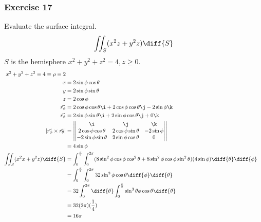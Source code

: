 \documentclass{math}
\begin{document}
\subsubsection*{Exercise 17}
Evaluate the surface integral.
\[ \iint_{S}(x^2z+y^2z)\diff{S} \]
\( S \) is the hemisphere \( x^2+y^2+z^2 = 4, z\ge0 \).
\begin{align*}
  x^2+y^2+z^2 = 4 \equiv \rho = 2 \\
  x &= 2\sin\phi\cos\theta \\
  y &= 2\sin\phi\sin\theta \\
  z &= 2\cos\phi \\
  \vec{r_{\phi}} &= 2\cos\phi\cos\theta\i+2\cos\phi\cos\theta\j-2\sin\phi\k \\
  \vec{r_{\phi}} &= 2\sin\phi\sin\theta\i+2\sin\phi\cos\theta\j+0\k \\
  |\vec{r_{\phi}}\times\vec{r_{\theta}}| &= \left|\begin{vmatrix}
    \i & \j & \k \\
    2\cos\phi\cos\theta & 2\cos\phi\sin\theta & -2\sin\phi \\
    -2\sin\phi\sin\theta & 2\sin\phi\cos\theta & 0 \\
  \end{vmatrix}\right| \\
  &= 4\sin\phi \\
  \iint_{S}(x^2x+y^2z)\diff{S} &= \int_{0}^{\frac{\pi}{2}}\int_{0}^{2\pi}
    (8\sin^2\phi\cos\phi\cos^2\theta+8\sin^2\phi\cos\phi\sin^2\theta)
    (4\sin\phi)\diff{\theta}\diff{\phi} \\
  &= \int_{0}^{\frac{\pi}{2}}\int_{0}^{2\pi}32\sin^3\phi\cos\theta
    \diff{\phi}\diff{\theta} \\
  &= 32\int_{0}^{2\pi}\diff{\theta}
    \int_{0}^{\frac{\pi}{2}}\sin^3\theta\phi\cos\theta\diff{\theta} \\
  &= 32(2\pi)(\frac{1}{4}) \\
  &= 16\pi
\end{align*}
\end{document}
